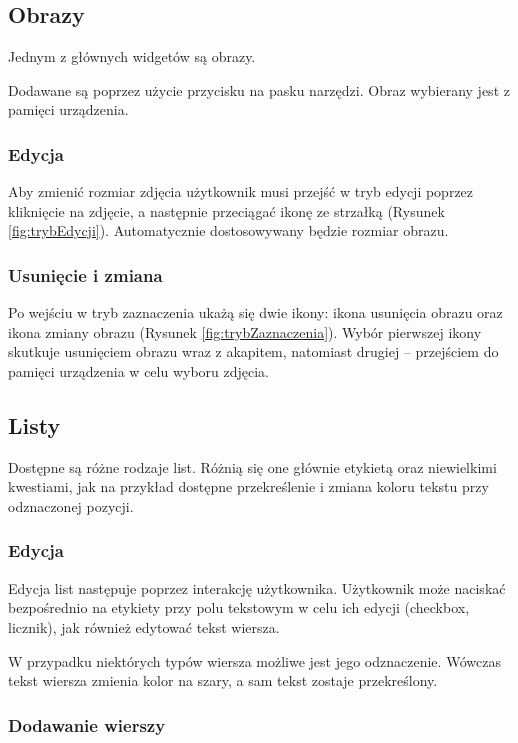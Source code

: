 \subsection{Obrazy}

Jednym z głównych widgetów są obrazy. 

Dodawane są poprzez użycie przycisku na pasku narzędzi. Obraz wybierany jest z pamięci urządzenia.

\subsubsection{Edycja}

Aby zmienić rozmiar zdjęcia użytkownik musi przejść w tryb edycji poprzez kliknięcie na zdjęcie, a następnie przeciągać ikonę ze strzałką (Rysunek \ref{fig:trybEdycji}). Automatycznie dostosowywany będzie rozmiar obrazu.

\subsubsection{Usunięcie i zmiana}

Po wejściu w tryb zaznaczenia ukażą się dwie ikony: ikona usunięcia obrazu oraz ikona zmiany obrazu (Rysunek \ref{fig:trybZaznaczenia}).
Wybór pierwszej ikony skutkuje usunięciem obrazu wraz z akapitem, natomiast drugiej -- przejściem do pamięci urządzenia w celu wyboru zdjęcia.

\subsection{Listy}

Dostępne są różne rodzaje list. Różnią się one głównie etykietą oraz niewielkimi kwestiami, jak na przykład dostępne przekreślenie i zmiana koloru tekstu przy odznaczonej pozycji.

\subsubsection{Edycja}

Edycja list następuje poprzez interakcję użytkownika. Użytkownik może naciskać bezpośrednio na etykiety przy polu tekstowym w celu ich edycji (checkbox, licznik), jak również edytować tekst wiersza.

W przypadku niektórych typów wiersza możliwe jest jego odznaczenie. Wówczas tekst wiersza zmienia kolor na szary, a sam tekst zostaje przekreślony.

\subsubsection{Dodawanie wierszy}

